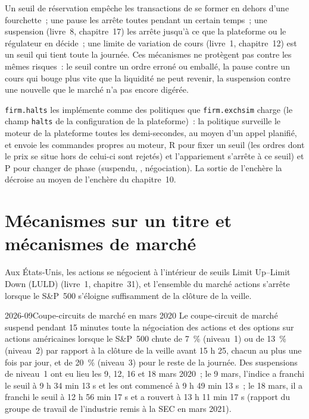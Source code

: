 Un seuil de réservation empêche les transactions de se former en dehors d'une fourchette~; une pause les arrête toutes pendant un certain temps~; une suspension (livre~8, chapitre~17) les arrête jusqu'à ce que la
plateforme ou le régulateur en décide~; une limite de variation de cours (livre~1, chapitre~12) est un seuil qui tient toute la journée. Ces mécanismes ne protègent pas contre les mêmes risques~: le
seuil contre un ordre erroné ou emballé, la pause contre un cours qui bouge plus vite que la liquidité ne peut revenir, la suspension contre une nouvelle que le marché n'a pas
encore digérée.

\texttt{firm.halts} les implémente comme des politiques que \texttt{firm.exchsim} charge (le champ \texttt{halts} de la configuration de la plateforme)~: la politique
surveille le moteur de la plateforme
toutes les demi-secondes, au moyen d'un appel planifié, et envoie les commandes propres au moteur, R pour fixer un seuil (les ordres dont le prix se situe hors de celui-ci sont rejetés) et l'appariement
s'arrête à ce seuil) et P pour changer de phase (suspendu, , négociation). La sortie de l'enchère la décroise au moyen de l'enchère du chapitre~10.

\label{lst:mx:circuit-breakers-and-halts:luld}

\section{Mécanismes sur un titre et mécanismes de marché}

Aux États-Unis, les actions se négocient à l'intérieur de seuils Limit Up--Limit Down (LULD) (livre~1, chapitre~31), et l'ensemble du marché actions s'arrête lorsque le
S\&P~500 s'éloigne suffisamment de la clôture de la veille.

\begin{dated}{2026-09}{Coupe-circuits de marché en mars 2020}\label{dat:mx:circuit-breakers-and-halts:mwcb}
Le coupe-circuit de marché suspend pendant 15 minutes toute la négociation des actions et des options sur actions américaines lorsque le S\&P~500 chute de 7~\% (niveau~1) ou de 13~\%
(niveau~2) par rapport à la clôture de la veille avant 15 h 25, chacun au plus une fois par jour, et de 20~\% (niveau~3) pour le reste de la journée. Des suspensions de niveau~1 ont eu lieu
les 9, 12, 16 et 18 mars 2020~; le 9 mars, l'indice a franchi le seuil à 9 h 34 min 13 s et les  ont commencé à 9 h 49 min 13 s~; le 18 mars, il
a franchi le seuil à 12 h 56 min 17 s et a rouvert à 13 h 11 min 17 s (rapport du groupe de travail de l'industrie remis à la SEC en mars 2021).
\end{dated}

